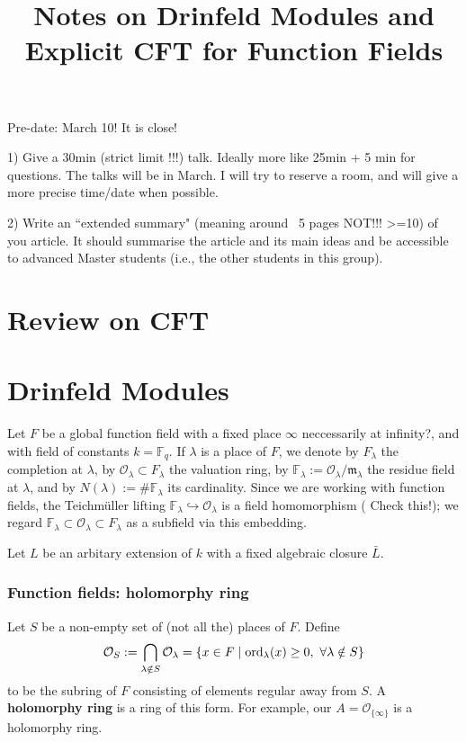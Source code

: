 \documentclass{article}
\title{Notes on Drinfeld Modules and Explicit CFT for Function Fields}
\newcommand{\F}{\mathbb{F}}
\renewcommand{\O}{\mathcal{O}}
\newcommand{\m}{\mathfrak{m}}
\begin{document}
\maketitle

Pre-date: March 10! It is close!

1) Give a 30min (strict limit !!!) talk. Ideally more like 25min + 5 min for questions.  The talks will be in March. I will try to reserve a room, and will give a more precise time/date when possible.

2) Write an ``extended summary" (meaning around ~5 pages NOT!!! >=10) of you article. It should summarise the article and its main ideas and be accessible to advanced Master students (i.e., the other students in this group).

\section{Review on CFT}



\section{Drinfeld Modules}
Let $F$ be a global function field with a fixed place $\infty$ {\color{red} neccessarily at infinity?}, and with field of constants $k = \F_q$.
If $\lambda$ is a place of $F$,
we denote by $F_\lambda$ the completion at $\lambda$,  by $\O_\lambda\subset F_\lambda$ the valuation ring,
by $\F_\lambda := \O_\lambda/\m_\lambda$ the residue field at $\lambda$,
and by $N(\lambda) := \#\F_\lambda$ its cardinality.
Since we are working with function fields, the Teichm\"uller lifting $\F_\lambda\hookrightarrow \O_\lambda$ is a field homomorphism ({\color{red} Check this!});
we regard $\F_\lambda\subset\O_\lambda\subset F_\lambda$ as a subfield via this embedding.


Let $L$ be an arbitary extension of $k$ with a fixed algebraic closure $\bar{L}$.


\subsubsection*{Function fields: holomorphy ring}
Let $S$ be a non-empty set of (not all the) places of $F$.
Define \[\O_S := \bigcap_{\lambda\notin S} \O_\lambda = \{x\in F\mid \ord_\lambda(x)\ge 0,\ \forall\lambda\notin S\}\]
to be the subring of $F$ consisting of elements regular away from $S$.
A \textbf{holomorphy ring} is a ring of this form.
For example, our $A = \O_{\{\infty\}}$ is a holomorphy ring.
\end{document}
